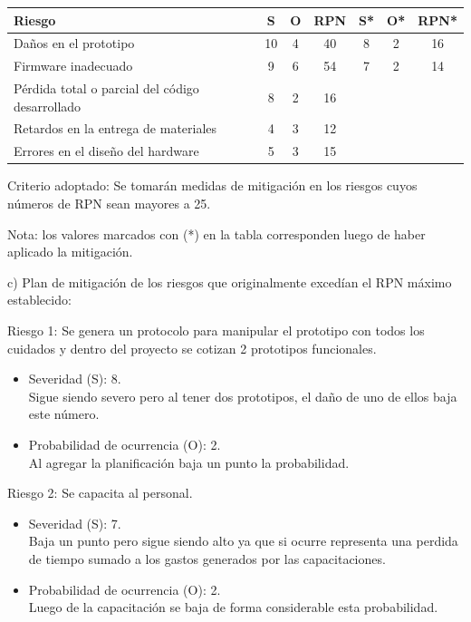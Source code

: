\documentclass[11pt]{charter}
\begin{document}
\begin{table}[H]
\centering
\begin{tabularx}{\linewidth}{@{}|X|c|c|c|c|c|c|@{}}
\hline
\rowcolor[HTML]{C0C0C0} 
Riesgo & S & O & RPN & S* & O* & RPN* \\ \hline
Daños en el prototipo	& 10  & 4  &   40  &  8  &  2  &  16    \\ \hline
Firmware inadecuado	& 9  & 6  &   54  &  7  &  2  &   14   \\ \hline
Pérdida total o parcial del código desarrollado	& 8  & 2  &   16  &    &    &      \\ \hline
Retardos en la entrega de materiales	&  4 & 3  &  12   &    &    &      \\ \hline
Errores en el diseño del hardware	& 5  & 3  &   15  &    &    &      \\ \hline
\end{tabularx}%
\end{table}

Criterio adoptado: 
Se tomarán medidas de mitigación en los riesgos cuyos números de RPN sean mayores a 25.

Nota: los valores marcados con (*) en la tabla corresponden luego de haber aplicado la mitigación.

c) Plan de mitigación de los riesgos que originalmente excedían el RPN máximo establecido:
 
Riesgo 1: Se genera un protocolo para manipular el prototipo con todos los cuidados y dentro del proyecto se cotizan 2 prototipos funcionales.
\begin{itemize}
\item Severidad (S): 8.\\
Sigue siendo severo pero al tener dos prototipos, el daño de uno de ellos baja este número.
\item Probabilidad de ocurrencia (O): 2.\\
Al agregar la planificación baja un punto la probabilidad. 
\end{itemize}

Riesgo 2: Se capacita al personal.
\begin{itemize}
\item Severidad (S): 7.\\
Baja un punto pero sigue siendo alto ya que si ocurre representa una perdida de tiempo sumado a los gastos generados por las capacitaciones.
\item Probabilidad de ocurrencia (O): 2.\\
Luego de la capacitación se baja de forma considerable esta probabilidad. 
\end{itemize}
\end{document}
